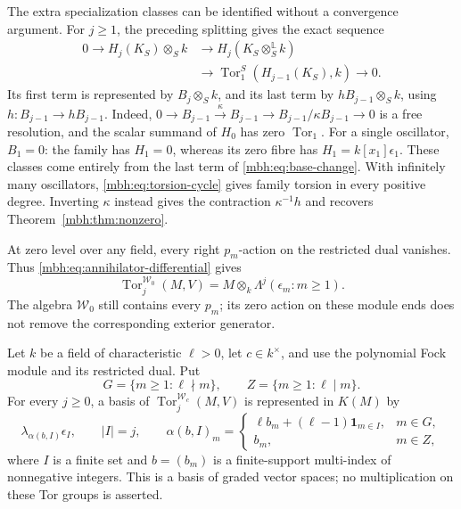The extra specialization classes can be identified without a
convergence argument.  For \(j\ge1\), the preceding splitting gives
the exact sequence
\begin{equation}\label{mbh:eq:base-change}
 \begin{aligned}
 0\longrightarrow H_j(K_S)\otimes_S k
 &\longrightarrow H_j(K_S\otimes_S^{\mathbb L}k)\\
 &\longrightarrow
 \operatorname{Tor}_1^S(H_{j-1}(K_S),k)
 \longrightarrow0.
 \end{aligned}
\end{equation}
Its first term is represented by \(B_j\otimes_Sk\), and its
last term by \(hB_{j-1}\otimes_Sk\), using
\(h:B_{j-1}\to hB_{j-1}\).
Indeed, \(0\to B_{j-1}\xrightarrow{\kappa}B_{j-1}
\to B_{j-1}/\kappa B_{j-1}\to0\) is a free resolution,
and the scalar summand of \(H_0\) has zero \(\operatorname{Tor}_1\).
For a single oscillator, \(B_1=0\): the family has \(H_1=0\),
whereas its zero fibre has
\(H_1=k[x_1]\epsilon_1\).  These classes come entirely from
the last term of \eqref{mbh:eq:base-change}.
With infinitely many oscillators,
\eqref{mbh:eq:torsion-cycle} gives family torsion in every
positive degree.  Inverting \(\kappa\) instead gives the
contraction \(\kappa^{-1}h\) and recovers
Theorem~\ref{mbh:thm:nonzero}.

At zero level over any field, every right \(p_m\)-action on
the restricted dual vanishes.  Thus
\eqref{mbh:eq:annihilator-differential} gives
\begin{equation}\label{mbh:eq:zero-level}
 \operatorname{Tor}^{\mathscr W_0}_j(M,V)
   =M\otimes_k\Lambda^j(\epsilon_m:m\ge1).
\end{equation}
The algebra \(\mathscr W_0\) still contains every \(p_m\);
its zero action on these module ends does not remove the
corresponding exterior generator.

\begin{theorem}
\label{mbh:thm:positive-characteristic}
Let \(k\) be a field of characteristic \(\ell>0\), let \(c\in k^\times\),
and use the polynomial Fock module and its restricted dual.
Put
\[
 G=\{m\ge1:\ell\nmid m\},\qquad
 Z=\{m\ge1:\ell\mid m\}.
\]
For every \(j\ge0\), a basis of
\(\operatorname{Tor}^{\mathscr W_c}_j(M,V)\) is represented
in \(K(M)\) by
\begin{equation}\label{mbh:eq:characteristic-basis}
 \lambda_{\alpha(b,I)}\epsilon_I,\qquad
 |I|=j,\qquad
 \alpha(b,I)_m=
 \begin{cases}
 \ell b_m+(\ell-1)\mathbf1_{m\in I},&m\in G,\\
 b_m,&m\in Z,
 \end{cases}
\end{equation}
where \(I\) is a finite set and \(b=(b_m)\) is a finite-support
multi-index of nonnegative integers.
This is a basis of graded vector spaces; no multiplication on
these Tor groups is asserted.
\end{theorem}

